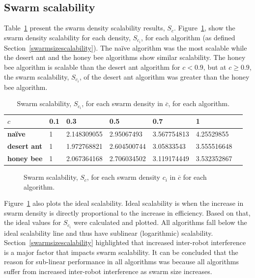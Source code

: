 \subsection{Swarm scalability}
\label{results:swarmscalability}
Table~\ref{table:swarmscalability} present the swarm density scalability results, $S_c$. Figure~\ref{fig:swarmscalability}, show the swarm density scalability for each density, $S_{c_i}$, for each algorithm (as defined Section~\ref{swarmsizescalability}). The na\"ive algorithm was the most scalable while the desert ant and the honey bee algorithms show similar scalability. The honey bee algorithm is scalable than the desert ant algorithm for $c < 0.9$, but at $c \geq 0.9$, the swarm scalability, $S_{c_i}$, of the desert ant algorithm was greater than the honey bee algorithm.

\begin{table}[]
\centering
\caption{Swarm scalability, $S_{c_i}$, for each swarm density in $\overline{c}$, for each algorithm.}
\label{table:swarmscalability}
\begin{tabular}{@{}lllllll@{}}
\toprule
\textbf{$c$}            & \textbf{0.1} & \textbf{0.3}         & \textbf{0.5}         & \textbf{0.7}         & \textbf{1}           \\ \midrule
\textbf{na\"ive}    & 1   & 2.148309055 & 2.95067493  & 3.567754813 & 4.25529855  \\
\textbf{desert ant} & 1   & 1.972768821 & 2.604500744 & 3.05833543  & 3.555516648 \\
\textbf{honey bee}  & 1   & 2.067364168 & 2.706034502 & 3.119174449 & 3.532352867 \\ \bottomrule
\end{tabular}
\end{table}

\begin{figure}[!htb]
\centering
\small
\resizebox{\textwidth}{!}{}
\caption{Swarm scalability, $S_c$, for each swarm density $c_i$ in $\overline{c}$ for each algorithm.}
\label{fig:swarmscalability}
\end{figure}

Figure~\ref{fig:swarmscalability} also plots the ideal scalability. Ideal scalability is when the increase in swarm density is directly proportional to the increase in efficiency. Based on that, the ideal values for $S_{c_i}$ were calculated and plotted. All algorithms fall below the ideal scalability line and thus have sublinear (logarithmic) scalability. Section~\ref{swarmsizescalability} highlighted that increased inter-robot interference is a major factor that impacts swarm scalability. It can be concluded that the reason for sub-linear performance in all algorithms was because all algorithms suffer from increased inter-robot interference as swarm size increases.

